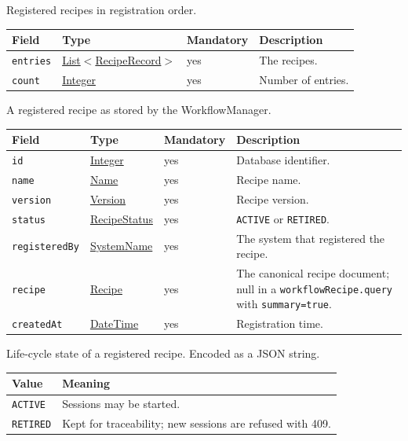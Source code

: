 \documentclass[a4paper]{arrowhead}
\newcommand{\mref}[1]{{\textcolor{ArrowheadPurple}{\hyperref[sec:model:#1]{#1}}}}
\newcommand{\pref}[1]{{\textcolor{ArrowheadGrey}{\hyperref[sec:model:primitives:#1]{#1}}}}
\begin{document}
Registered recipes in registration order.

{\small
\begin{longtable}{|p{3.7cm}|p{4.2cm}|p{1.6cm}|p{6.3cm}|}

\hline
\rowcolor{gray!33} Field & Type & Mandatory & Description \\ \hline
\endhead
\texttt{entries} & \pref{List}$<$\mref{RecipeRecord}$>$ & yes & The recipes. \\ \hline
\texttt{count} & \pref{Integer} & yes & Number of entries. \\ \hline
\end{longtable}
}

A registered recipe as stored by the WorkflowManager.

{\small
\begin{longtable}{|p{3.7cm}|p{4.2cm}|p{1.6cm}|p{6.3cm}|}

\hline
\rowcolor{gray!33} Field & Type & Mandatory & Description \\ \hline
\endhead
\texttt{id} & \pref{Integer} & yes & Database identifier. \\ \hline
\texttt{name} & \pref{Name} & yes & Recipe name. \\ \hline
\texttt{version} & \pref{Version} & yes & Recipe version. \\ \hline
\texttt{status} & \mref{RecipeStatus} & yes & \texttt{ACTIVE} or \texttt{RETIRED}. \\ \hline
\texttt{registeredBy} & \pref{SystemName} & yes & The system that registered the recipe. \\ \hline
\texttt{recipe} & \mref{Recipe} & yes & The canonical recipe document; null in a \texttt{workflow\allowbreak{}Recipe.\allowbreak{}query} with \texttt{summary=true}. \\ \hline
\texttt{createdAt} & \pref{DateTime} & yes & Registration time. \\ \hline
\end{longtable}
}

Life-cycle state of a registered recipe.
 Encoded as a JSON string.
{\small
\begin{longtable}{|p{3.9cm}|p{11.9cm}|}

\hline
\rowcolor{gray!33} Value & Meaning \\ \hline
\endhead
\texttt{ACTIVE} & Sessions may be started. \\ \hline
\texttt{RETIRED} & Kept for traceability; new sessions are refused with 409. \\ \hline
\end{longtable}
}
\end{document}
